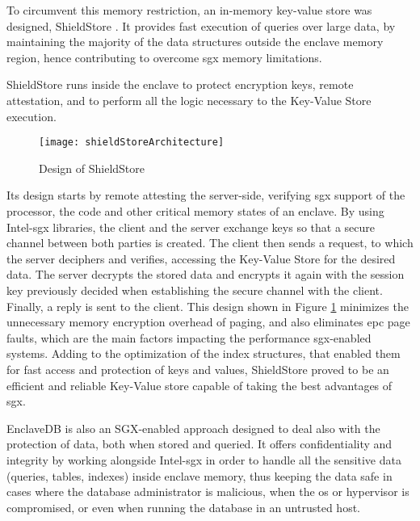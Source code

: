 To circumvent this memory restriction, an in-memory key-value store was designed, ShieldStore \cite{shieldStorePaper}. It provides fast execution of queries over large data, by maintaining the majority of the data structures outside the enclave memory region, hence contributing to overcome \gls{sgx} memory limitations.

ShieldStore runs inside the enclave to protect encryption keys, remote attestation, and to perform all the logic necessary to the Key-Value Store execution.
\begin{figure}[htbp]
	\centering
	{\texttt{[image: shieldStoreArchitecture]}}
	\caption{Design of ShieldStore}
	\label{fig:shieldStoreArchitecture}
\end{figure}

Its design starts by remote attesting the server-side, verifying \gls{sgx} support of the processor, the code and other critical memory states of an enclave. By using Intel-\gls{sgx} libraries, the client and the server exchange keys so that a secure channel between both parties is created. The client then sends a request, to which the server deciphers and verifies, accessing the Key-Value Store for the desired data. The server decrypts the stored data and encrypts it again with the session key previously decided when establishing the secure channel with the client. Finally, a reply is sent to the client.    
This design shown in Figure \ref{fig:shieldStoreArchitecture} minimizes the unnecessary memory encryption overhead of paging, and also eliminates \gls{epc} page faults, which are the main factors impacting the performance \gls{sgx}-enabled systems. Adding to the optimization of the index structures, that enabled them for fast access and protection of keys and values, ShieldStore proved to be an efficient and reliable Key-Value store capable of taking the best advantages of \gls{sgx}.\newline


EnclaveDB \cite{enclavedbPaper} is also an SGX-enabled approach designed to deal also with the protection of data, both when stored and queried. It offers confidentiality and integrity by working alongside Intel-\gls{sgx} in order to handle all the sensitive data (queries, tables, indexes) inside enclave memory, thus keeping the data safe in cases  where the database administrator is malicious, when the \gls{os} or hypervisor is compromised, or even when running the database in an untrusted host.

